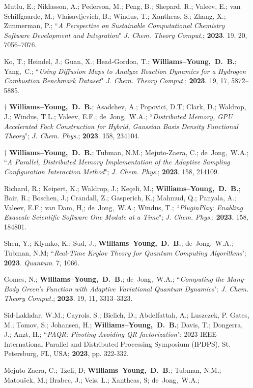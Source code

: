 \documentclass[10pt]{res} %
\newcommand*\me[0]{{\bf Williams--Young,~D.~B.}}
\newcommand*\cy[0]{Yang,~C.}
\newcommand*\bdj[0]{de~Jong,~W.A.}
\begin{document}
\begin{resume}
\begin{etaremune}
	Mutlu, E.; Niklasson, A.; Pederson, M.; Peng, B.; Shepard, R.; Valeev, E.; van Schilfgaarde, M.; 
	Vlaisavljevich, B.; Windus, T.; Xantheas, S.; Zhang, X.; Zimmerman, P.;
	``\emph{A Perspective on Sustainable Computational Chemistry Software Development and Integration}"
	\emph{J. Chem. Theory Comput.}; \textbf{2023}. 19, 20, 7056–7076.
  \item Ko, T.; Heindel, J.; Guan, X.;  Head-Gordon, T.; \me; \cy; 
        ``\emph{Using Diffusion Maps to Analyze Reaction Dynamics for a Hydrogen Combustion Benchmark Dataset}"
        \emph{J. Chem. Theory Comput.}; \textbf{2023}. 19, 17, 5872–5885.
  \item $\dagger$ \me; Asadchev, A.; Popovici, D.T; Clark, D.; Waldrop, J.; Windus, T.L.;
        Valeev, E.F.; \bdj;
        ``\emph{Distributed Memory, GPU Accelerated Fock Construction for Hybrid, Gaussian 
                Basis Density Functional Theory}";
        \emph{J. Chem. Phys.}; \textbf{2023}. 158, 234104.
  \item $\dagger$ \me; Tubman, N.M.; Mejuto-Zaera, C.; \bdj;
        ``\emph{A Parallel, Distributed Memory Implementation of the Adaptive 
                Sampling Configuration Interaction Method}";
        \emph{J. Chem. Phys.}; \textbf{2023}. 158, 214109. 
  \item Richard, R.; Keipert, K.; Waldrop, J.; Keçeli, M.; \me; Bair, R.; Boschen, J.; 
        Crandall, Z.; Gasperich, K.; Mahmud, Q.; Panyala, A.; Valeev, E.F.; van Dam, H,; 
        \bdj; Windus, T.;
       ``\emph{PluginPlay: Enabling Exascale Scientific Software One Module at a Time}";
        \emph{J. Chem. Phys.}; \textbf{2023}. 158, 184801. 
  \item Shen, Y.; Klymko, K.; Sud, J.; \me; \bdj; Tubman, N.M;
    ``\emph{Real-Time Krylov Theory for Quantum Computing Algorithms}";
    \textbf{2023}. \emph{Quantum}. 7, 1066.
  \item Gomes, N.; \me;  \bdj;
    ``\emph{Computing the Many-Body Green's Function with Adaptive Variational 
            Quantum Dynamics}";
    \emph{J. Chem. Theory Comput.}; \textbf{2023}. 19, 11, 3313–3323.
  \item Sid-Lakhdar, W.M.; Cayrols, S.; Bielich, D.; Abdelfattah, A.; Luszczek, P.  Gates, M.; Tomov, S.; 
        Johansen, H.; \me; Davis, T.; Dongerra, J.; Anzt, H.; 
        ``\emph{PAQR: Pivoting Avoiding QR factorization}"; 
        2023 IEEE International Parallel and Distributed Processing Symposium (IPDPS), St. Petersburg, FL, USA; \textbf{2023}, pp. 322-332.
  \item Mejuto-Zaera, C.; Tzeli, D; \me; Tubman, N.M.; Matoušek, M.; Brabec, J.; Veis, L.; Xantheas, S; \bdj; 

\end{etaremune}
\end{resume}
\end{document}
